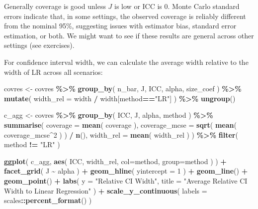 \documentclass[
]{book}
\newenvironment{Shaded}{\begin{snugshade}}{\end{snugshade}}
\newcommand{\AttributeTok}[1]{\textcolor[rgb]{0.13,0.29,0.53}{#1}}
\newcommand{\DecValTok}[1]{\textcolor[rgb]{0.00,0.00,0.81}{#1}}
\newcommand{\FunctionTok}[1]{\textcolor[rgb]{0.13,0.29,0.53}{\textbf{#1}}}
\newcommand{\NormalTok}[1]{#1}
\newcommand{\OtherTok}[1]{\textcolor[rgb]{0.56,0.35,0.01}{#1}}
\newcommand{\SpecialCharTok}[1]{\textcolor[rgb]{0.81,0.36,0.00}{\textbf{#1}}}
\newcommand{\StringTok}[1]{\textcolor[rgb]{0.31,0.60,0.02}{#1}}
\begin{document}
Generally coverage is good unless \(J\) is low or ICC is 0.
Monte Carlo standard errors indicate that, in some settings, the observed coverage is reliably different from the nominal 95\%, suggesting issues with estimator bias, standard error estimation, or both.
We might want to see if these results are general across other settings (see exercises).

For confidence interval width, we can calculate the average width relative to the width of LR across all scenarios:

\begin{Shaded}
\begin{Highlighting}[]
\NormalTok{covres }\OtherTok{\textless{}{-}}\NormalTok{ covres }\SpecialCharTok{\%\textgreater{}\%}
  \FunctionTok{group\_by}\NormalTok{( n\_bar, J, ICC, alpha, size\_coef ) }\SpecialCharTok{\%\textgreater{}\%}
  \FunctionTok{mutate}\NormalTok{( }\AttributeTok{width\_rel =}\NormalTok{ width }\SpecialCharTok{/}\NormalTok{ width[method}\SpecialCharTok{==}\StringTok{"LR"}\NormalTok{] ) }\SpecialCharTok{\%\textgreater{}\%}
  \FunctionTok{ungroup}\NormalTok{()}

\NormalTok{c\_agg }\OtherTok{\textless{}{-}}\NormalTok{ covres }\SpecialCharTok{\%\textgreater{}\%}
  \FunctionTok{group\_by}\NormalTok{( ICC, J, alpha, method ) }\SpecialCharTok{\%\textgreater{}\%}
  \FunctionTok{summarise}\NormalTok{( }\AttributeTok{coverage =} \FunctionTok{mean}\NormalTok{( coverage ),}
             \AttributeTok{coverage\_mcse =} \FunctionTok{sqrt}\NormalTok{( }\FunctionTok{mean}\NormalTok{( coverage\_mcse}\SpecialCharTok{\^{}}\DecValTok{2}\NormalTok{ ) ) }\SpecialCharTok{/} \FunctionTok{n}\NormalTok{(),}
             \AttributeTok{width\_rel =} \FunctionTok{mean}\NormalTok{( width\_rel ) ) }\SpecialCharTok{\%\textgreater{}\%}
  \FunctionTok{filter}\NormalTok{( method }\SpecialCharTok{!=} \StringTok{"LR"}\NormalTok{ )}
  
\FunctionTok{ggplot}\NormalTok{( c\_agg, }\FunctionTok{aes}\NormalTok{( ICC, width\_rel, }\AttributeTok{col=}\NormalTok{method, }\AttributeTok{group=}\NormalTok{method ) ) }\SpecialCharTok{+}
  \FunctionTok{facet\_grid}\NormalTok{( J }\SpecialCharTok{\textasciitilde{}}\NormalTok{ alpha ) }\SpecialCharTok{+}
  \FunctionTok{geom\_hline}\NormalTok{( }\AttributeTok{yintercept =} \DecValTok{1}\NormalTok{ ) }\SpecialCharTok{+}
  \FunctionTok{geom\_line}\NormalTok{() }\SpecialCharTok{+} \FunctionTok{geom\_point}\NormalTok{() }\SpecialCharTok{+}
  \FunctionTok{labs}\NormalTok{( }\AttributeTok{y =} \StringTok{"Relative CI Width"}\NormalTok{,}
        \AttributeTok{title =} \StringTok{"Average Relative CI Width to Linear Regression"}\NormalTok{ ) }\SpecialCharTok{+}
  \FunctionTok{scale\_y\_continuous}\NormalTok{( }\AttributeTok{labels =}\NormalTok{ scales}\SpecialCharTok{::}\FunctionTok{percent\_format}\NormalTok{() )}
\end{Highlighting}
\end{Shaded}
\end{document}
